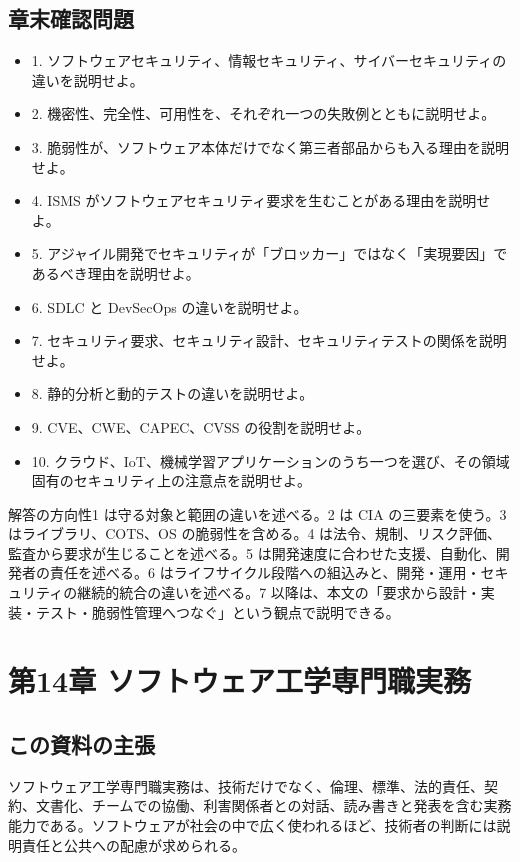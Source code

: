 \documentclass[a4paper,11pt]{ltjsarticle}
\numberwithin{figure}{section}
\numberwithin{table}{section}
\begin{document}
\subsection{章末確認問題}
\begin{itemize}[leftmargin=2em]
\item 1. ソフトウェアセキュリティ、情報セキュリティ、サイバーセキュリティの違いを説明せよ。
\item 2. 機密性、完全性、可用性を、それぞれ一つの失敗例とともに説明せよ。
\item 3. 脆弱性が、ソフトウェア本体だけでなく第三者部品からも入る理由を説明せよ。
\item 4. ISMS がソフトウェアセキュリティ要求を生むことがある理由を説明せよ。
\item 5. アジャイル開発でセキュリティが「ブロッカー」ではなく「実現要因」であるべき理由を説明せよ。
\item 6. SDLC と DevSecOps の違いを説明せよ。
\item 7. セキュリティ要求、セキュリティ設計、セキュリティテストの関係を説明せよ。
\item 8. 静的分析と動的テストの違いを説明せよ。
\item 9. CVE、CWE、CAPEC、CVSS の役割を説明せよ。
\item 10. クラウド、IoT、機械学習アプリケーションのうち一つを選び、その領域固有のセキュリティ上の注意点を説明せよ。
\end{itemize}
\begin{notebox}{解答の方向性}1 は守る対象と範囲の違いを述べる。2 は CIA の三要素を使う。3 はライブラリ、COTS、OS の脆弱性を含める。4 は法令、規制、リスク評価、監査から要求が生じることを述べる。5 は開発速度に合わせた支援、自動化、開発者の責任を述べる。6 はライフサイクル段階への組込みと、開発・運用・セキュリティの継続的統合の違いを述べる。7 以降は、本文の「要求から設計・実装・テスト・脆弱性管理へつなぐ」という観点で説明できる。\end{notebox}

\section{第14章 ソフトウェア工学専門職実務}
\subsection*{この資料の主張}

ソフトウェア工学専門職実務は、技術だけでなく、倫理、標準、法的責任、契約、文書化、チームでの協働、利害関係者との対話、読み書きと発表を含む実務能力である。ソフトウェアが社会の中で広く使われるほど、技術者の判断には説明責任と公共への配慮が求められる。
\end{document}
